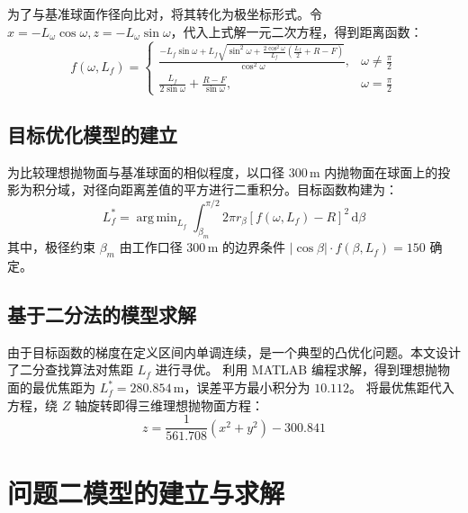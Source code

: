 \documentclass[UTF8,a4paper,zihao=-4]{ctexart}
\newcommand{\abs}[1]{\left\lvert #1 \right\rvert}
\newcommand{\dd}{\,\mathrm{d}}
\DeclareMathOperator*{\argmin}{arg\,min}
\begin{document}
为了与基准球面作径向比对，将其转化为极坐标形式。令 $x = -L_\omega \cos\omega, z = -L_\omega \sin\omega$，代入上式解一元二次方程，得到距离函数：
\begin{equation}
f(\omega, L_f) = \begin{cases} \frac{-L_f \sin\omega + L_f\sqrt{\sin^2\omega + \frac{2\cos^2\omega}{L_f}(\frac{L_f}{2}+R-F)}}{\cos^2\omega}, & \omega \neq \frac{\pi}{2} \\ \frac{L_f}{2\sin\omega} + \frac{R-F}{\sin\omega}, & \omega = \frac{\pi}{2} \end{cases}
\end{equation}

\subsection{目标优化模型的建立}
为比较理想抛物面与基准球面的相似程度，以口径 $300\,\mathrm{m}$ 内抛物面在球面上的投影为积分域，对径向距离差值的平方进行二重积分。目标函数构建为：
\begin{equation}
L_f^* = \argmin_{L_f} \int_{\beta_m}^{\pi/2} 2\pi r_\beta [f(\omega, L_f) - R]^2 \dd\beta
\end{equation}
其中，极径约束 $\beta_m$ 由工作口径 $300\,\mathrm{m}$ 的边界条件 $\abs{\cos\beta} \cdot f(\beta, L_f) = 150$ 确定。

\subsection{基于二分法的模型求解}
由于目标函数的梯度在定义区间内单调连续，是一个典型的凸优化问题。本文设计了二分查找算法对焦距 $L_f$ 进行寻优。
利用 MATLAB 编程求解，得到理想抛物面的最优焦距为 $L_f^* = 280.854\,\mathrm{m}$，误差平方最小积分为 $10.112$。
将最优焦距代入方程，绕 $Z$ 轴旋转即得三维理想抛物面方程：
\begin{equation}
z = \frac{1}{561.708}(x^2 + y^2) - 300.841
\end{equation}

\section{问题二模型的建立与求解}
\end{document}
